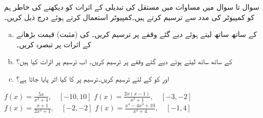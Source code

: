 سوال  تا سوال  میں مساوات  میں مستقل  کی تبدیلی کے اثرات کو دیکھنے کی خاطر ہم  کو کمپیوٹر کی مدد سے ترسیم کرتے ہیں۔کمپیوٹر استعمال کرتے ہوئے درج ذیل کریں۔
\begin{enumerate}[a.]
\item
{} کے ساتھ ساتھ  لیتے ہوئے دیے گئے وقفے پر  ترسیم کریں۔  کی (مثبت) قیمت  بڑھانے کے اثرات پر تبصرہ کریں۔
\item
{} کے ساتھ ساتھ  لیتے ہوئے دیے گئے وقفے پر  ترسیم کریں۔ اب ترسیم پر اثرات کیا ہیں؟
\item
{} اور  کو  کے لئے ترسیم کریں۔ترسیم پر  کا کیا اثر پایا جاتا ہے؟
\end{enumerate}

$f(x)=\tfrac{5x}{x^2+4},\quad [-10,10]$
$f(x)=\tfrac{2x(x-1)}{x^2+1},\quad [-3,-2]$
$f(x)=\tfrac{x+1}{2x^2+1},\quad [-2,-2]$
$f(x)=\tfrac{x^4-4x^3+10}{x^2+4},\quad [-1,4]$

